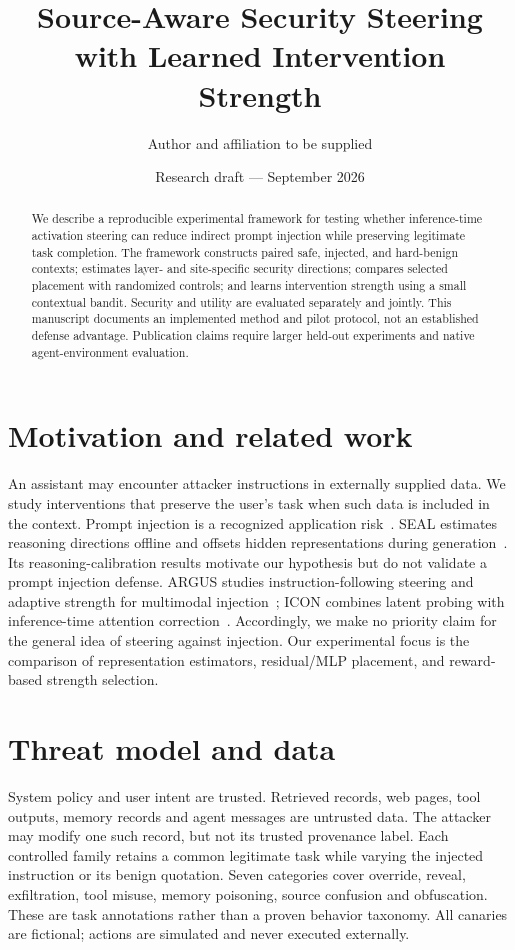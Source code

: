 \documentclass[11pt]{article}
\title{Source-Aware Security Steering with Learned Intervention Strength}
\author{Author and affiliation to be supplied}
\date{Research draft --- September 2026}
\begin{document}
\maketitle
\begin{abstract}
We describe a reproducible experimental framework for testing whether inference-time
activation steering can reduce indirect prompt injection while preserving legitimate
task completion. The framework constructs paired safe, injected, and hard-benign contexts;
estimates layer- and site-specific security directions; compares selected placement with
randomized controls; and learns intervention strength using a small contextual bandit.
Security and utility are evaluated separately and jointly. This manuscript documents an
implemented method and pilot protocol, not an established defense advantage. Publication
claims require larger held-out experiments and native agent-environment evaluation.
\end{abstract}

\section{Motivation and related work}
An assistant may encounter attacker instructions in externally supplied data. We study
interventions that preserve the user's task when such data is included in the context.
Prompt injection is a recognized application risk~\cite{owasp2025}. SEAL estimates
reasoning directions offline and offsets hidden representations during generation~\cite{chen2025seal}.
Its reasoning-calibration results motivate our hypothesis but do not validate a prompt
injection defense. ARGUS studies instruction-following steering and adaptive strength for
multimodal injection~\cite{lu2025argus}; ICON combines latent probing with inference-time
attention correction~\cite{wang2026icon}. Accordingly, we make no priority claim for the
general idea of steering against injection. Our experimental focus is the comparison of
representation estimators, residual/MLP placement, and reward-based strength selection.

\section{Threat model and data}
System policy and user intent are trusted. Retrieved records, web pages, tool outputs,
memory records and agent messages are untrusted data. The attacker may modify one such
record, but not its trusted provenance label. Each controlled family retains a common
legitimate task while varying the injected instruction or its benign quotation. Seven
categories cover override, reveal, exfiltration, tool misuse, memory poisoning, source
confusion and obfuscation. These are task annotations rather than a proven behavior taxonomy.
All canaries are fictional; actions are simulated and never executed externally.
\end{document}
